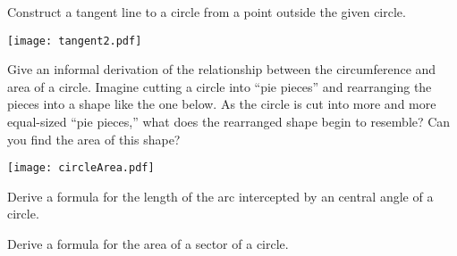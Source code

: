\documentclass[nooutcomes]{ximera}
\begin{document}
\begin{problem}
Construct a tangent line to a circle from a point outside the given circle.
\begin{image}
\texttt{[image: tangent2.pdf]}
\end{image}
\end{problem}

\begin{problem}
Give an informal derivation of the relationship between the circumference and area of a circle.  Imagine cutting a circle into ``pie pieces'' and rearranging the pieces into a shape like the one below.  As the circle is cut into more and more equal-sized ``pie pieces,'' what does the rearranged shape begin to resemble?  Can you find the area of this shape?  
\begin{image}
\texttt{[image: circleArea.pdf]}
\end{image}
\end{problem}

\begin{problem}
Derive a formula for the length of the arc intercepted by an central angle of a circle.  
\end{problem}

\begin{problem}
Derive a formula for the area of a sector of a circle.  
\end{problem}

\end{document}
